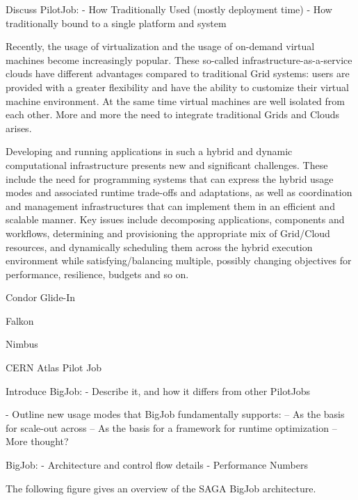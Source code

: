 \documentclass[conference,final]{IEEEtran}
\begin{document}
Discuss PilotJob:
- How Traditionally Used (mostly deployment time)
- How traditionally bound to a single platform and system

Recently, the usage of virtualization and the usage of on-demand virtual machines
become increasingly popular. These so-called infrastructure-as-a-service clouds have
different advantages compared to traditional Grid systems: users are provided
with a greater flexibility and have the ability to customize their virtual machine
environment. At the same time virtual machines are well isolated from each other. More and
more the need to integrate traditional Grids and Clouds arises.

Developing and running applications in such a hybrid and dynamic computational 
infrastructure presents new and significant challenges. These include the need for programming 
systems that can express the hybrid usage modes and associated runtime trade-offs and adaptations, 
as well as coordination and management infrastructures that can implement them in an efficient 
and scalable manner. Key issues include decomposing applications, components and workflows, 
determining and provisioning the appropriate mix of Grid/Cloud resources, and dynamically scheduling 
them across the hybrid execution environment while satisfying/balancing multiple, possibly changing 
objectives for performance, resilience, budgets and so on.



Condor Glide-In

Falkon

Nimbus

CERN Atlas Pilot Job~\cite{1555338}


Introduce BigJob:
 - Describe it, and how it differs from other PilotJobs

 - Outline new usage modes that BigJob fundamentally supports:
    -- As the basis for scale-out across
    -- As the basis for a framework for runtime optimization
    -- More thought?

BigJob:
 - Architecture and control flow details
 - Performance Numbers



The following figure gives an overview of the SAGA BigJob architecture.
\end{document}
